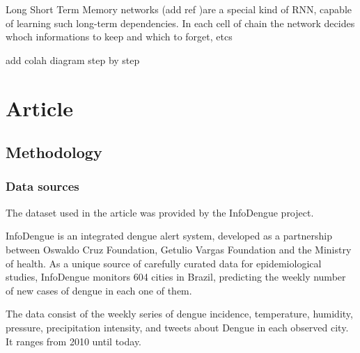 \documentclass[12pt]{report}
\begin{document}
Long Short Term Memory networks (add ref )are a special kind of RNN, capable of learning
such long-term dependencies. In each cell of chain the network decides whoch informations to keep
and which to forget, etcs

add colah diagram step by step

\newpage
\chapter{Article}

\section{Methodology}


\subsection{Data sources}
The dataset used in the article was provided by the InfoDengue project. 

InfoDengue \citep{Codeco046193} is an integrated dengue alert system, developed as a partnership between Oswaldo Cruz Foundation, Getulio Vargas Foundation and the Ministry of health. As a unique source of carefully curated data for epidemiological studies, InfoDengue monitors 604 cities in Brazil, predicting the weekly number of new cases of dengue in each one of them.

The data consist of the weekly series of dengue incidence,  temperature, humidity, pressure, precipitation intensity, and tweets about Dengue in each observed city. It ranges from 2010 until today.
\end{document}
